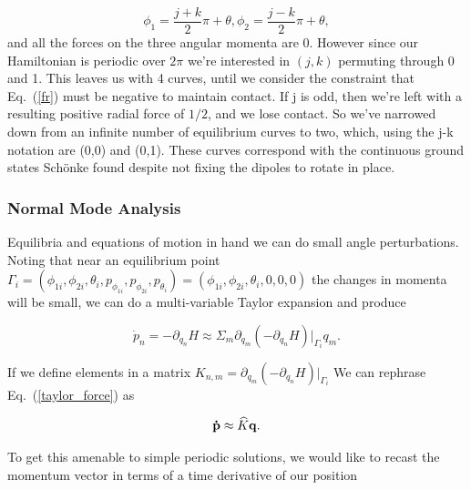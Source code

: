 \documentclass[prbg,preprint]{revtex4-1}
\newcommand{\cvec}[1]{{\rm{\bf{#1}}}}
\begin{document}
\begin{subequations}
	\begin{equation}
		\phi_1 = \frac{j+k}{2}\pi +\theta,
	\end{equation}
	\begin{equation}
		\phi_2 = \frac{j-k}{2}\pi +\theta,
	\end{equation}
\end{subequations}
and all the forces on the three angular momenta are 0. However since our Hamiltonian is periodic over $2\pi$ we're interested in $(j,k)$ permuting through 0 and 1. This leaves us with 4 curves, until we consider the constraint that Eq.~(\ref{fr}) must be negative to maintain contact. If j is odd, then we're left with a resulting positive radial force of $1/2$, and we lose contact. So we've narrowed down from an infinite number of equilibrium curves to two, which, using the j-k notation are (0,0) and (0,1). These curves correspond with the continuous ground states Schönke \cite{PhysRevApplied.4.064007} found despite not fixing the dipoles to rotate in place.



\subsubsection{Normal Mode Analysis}
Equilibria and equations of motion in hand we can do small angle perturbations. Noting that near an equilibrium point 
$\Gamma_i = 
(
\phi_{1i},\phi_{2i},\theta_{i},
p_{\phi_{1i}},p_{\phi_{2i}},p_{\theta_{i}}
)
=
(\phi_{1i},\phi_{2i},\theta_{i},0,0,0)
$ 
the changes in momenta will be small, we can do a multi-variable Taylor expansion and produce 

\begin{equation}\label{taylor_force}
	\dot p_n 
	=
	-\partial_{q_n}H
	\approx 
	\Sigma_m \partial_{q_m}(-\partial_{q_n} H)|_{\Gamma_i} q_m .
\end{equation}

If we define elements in a matrix 
$K_{n,m}= \partial_{q_m}(-\partial_{q_n} H)|_{\Gamma_i}$
We can rephrase Eq.~(\ref{taylor_force}) as 

\begin{equation} \label{matrix_force}
	\cvec{ \dot{ p }} \approx \widehat K \cvec q.
\end{equation}

To get this amenable to simple periodic solutions, we would like to recast the momentum vector in terms of a time derivative of our position
\end{document}
